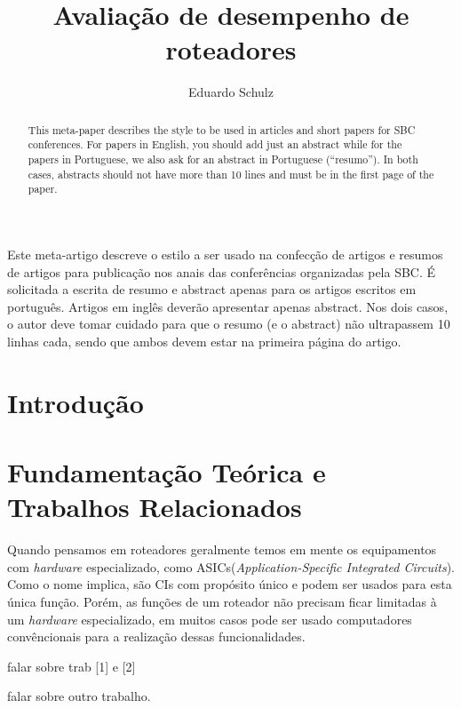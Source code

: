 \documentclass[12pt]{article}
\title{Avaliação de desempenho de roteadores}
\author{Eduardo Schulz\inst{1}}
\begin{document}
 

\maketitle

\begin{abstract}
  This meta-paper describes the style to be used in articles and short papers
  for SBC conferences. For papers in English, you should add just an abstract
  while for the papers in Portuguese, we also ask for an abstract in
  Portuguese (``resumo''). In both cases, abstracts should not have more than
  10 lines and must be in the first page of the paper.
\end{abstract}
     
\begin{resumo} 
  Este meta-artigo descreve o estilo a ser usado na confecção de artigos e
  resumos de artigos para publicação nos anais das conferências organizadas
  pela SBC. É solicitada a escrita de resumo e abstract apenas para os artigos
  escritos em português. Artigos em inglês deverão apresentar apenas abstract.
  Nos dois casos, o autor deve tomar cuidado para que o resumo (e o abstract)
  não ultrapassem 10 linhas cada, sendo que ambos devem estar na primeira
  página do artigo.
\end{resumo}


\section{Introdução}


\section{Fundamentação Teórica e Trabalhos Relacionados}

Quando pensamos em roteadores geralmente temos em mente os equipamentos com \textit{hardware} especializado, como ASICs(\textit{Application-Specific Integrated Circuits}). Como o nome implica, são CIs com propósito único e podem ser usados para esta única função. Porém, as funções de um roteador não precisam ficar limitadas à um \textit{hardware} especializado, em muitos casos pode ser usado computadores convêncionais para a realização dessas funcionalidades.

falar sobre trab [1] e [2]

falar sobre outro trabalho.

\end{document}
